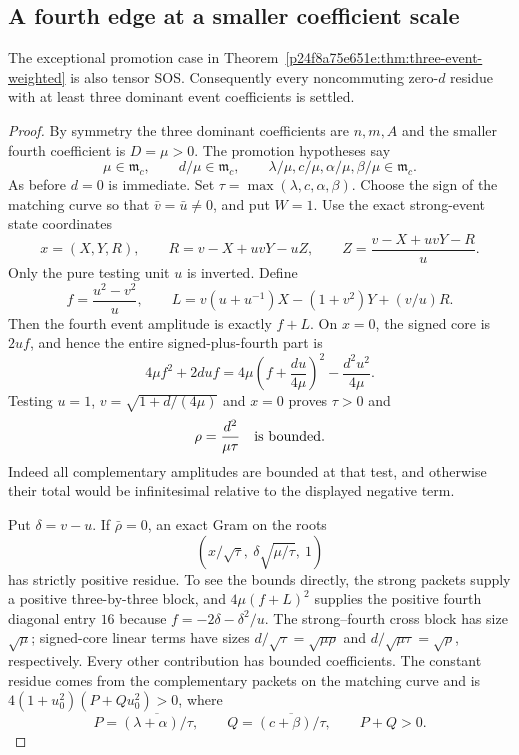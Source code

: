 \subsection{A fourth edge at a smaller coefficient scale}
\begin{proposition}\label{p4e9ae18b7af4:prop:fourth-edge-promotion}
The exceptional promotion case in Theorem~\ref{p24f8a75e651e:thm:three-event-weighted} is also tensor SOS. Consequently every noncommuting zero-$d$ residue with at least three dominant event coefficients is settled.
\end{proposition}
\begin{proof}
By symmetry the three dominant coefficients are $n,m,A$ and the smaller fourth coefficient is $D=\mu>0$. The promotion hypotheses say
\[
\mu\in\mathfrak m_c,\qquad d/\mu\in\mathfrak m_c,
\qquad \lambda/\mu,c/\mu,\alpha/\mu,\beta/\mu\in\mathfrak m_c.
\]
As before $d=0$ is immediate. Set $\tau=\max(\lambda,c,\alpha,\beta)$. Choose the sign of the matching curve so that $\bar v=\bar u\ne0$, and put $W=1$. Use the exact strong-event state coordinates
\[
x=(X,Y,R),\qquad R=v-X+uvY-uZ,
\qquad Z=\frac{v-X+uvY-R}{u}.
\]
Only the pure testing unit $u$ is inverted. Define
\[
f=\frac{u^2-v^2}{u},\qquad
L=v(u+u^{-1})X-(1+v^2)Y+(v/u)R.
\]
Then the fourth event amplitude is exactly $f+L$. On $x=0$, the signed core is $2uf$, and hence the entire signed-plus-fourth part is
\[
4\mu f^2+2duf=4\mu\left(f+\frac{du}{4\mu}\right)^2
 -\frac{d^2u^2}{4\mu}.
\]
Testing $u=1$, $v=\sqrt{1+d/(4\mu)}$ and $x=0$ proves $\tau>0$ and
\[
\rho=\frac{d^2}{\mu\tau}\quad\hbox{is bounded}.
\]
Indeed all complementary amplitudes are bounded at that test, and otherwise their total would be infinitesimal relative to the displayed negative term.

Put $\delta=v-u$. If $\bar\rho=0$, an exact Gram on the roots
\[
\left(x/\sqrt\tau,\ \delta\sqrt{\mu/\tau},\ 1\right)
\]
has strictly positive residue. To see the bounds directly, the strong packets supply a positive three-by-three block, and $4\mu(f+L)^2$ supplies the positive fourth diagonal entry $16$ because $f=-2\delta-\delta^2/u$. The strong--fourth cross block has size $\sqrt\mu$; signed-core linear terms have sizes $d/\sqrt\tau=\sqrt{\mu\rho}$ and $d/\sqrt{\mu\tau}=\sqrt\rho$, respectively. Every other contribution has bounded coefficients. The constant residue comes from the complementary packets on the matching curve and is
$4(1+u_0^2)(P+Qu_0^2)>0$, where
\[
P=\overline{(\lambda+\alpha)/\tau},\qquad
Q=\overline{(c+\beta)/\tau},\qquad P+Q>0.
\]


\end{proof}
